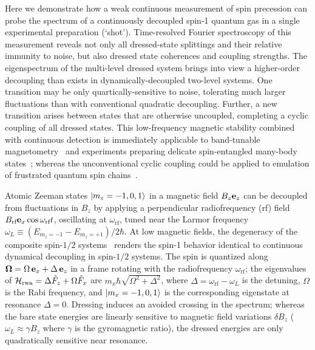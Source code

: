 \documentclass[aps,prl,reprint,superscriptaddress,floatfix]{revtex4-1}
\begin{document}
Here we demonstrate how a weak continuous measurement of spin precession can probe the spectrum of a continuously decoupled spin-1 quantum gas in a single experimental preparation (`shot').
Time-resolved Fourier spectroscopy of this measurement reveals not only all dressed-state splittings and their relative immunity to noise, but also dressed state coherences and coupling strengths.
The eigenspectrum of the multi-level dressed system brings into view a higher-order decoupling than exists in dynamically-decoupled two-level systems.
One transition may be only quartically-sensitive to noise, tolerating much larger fluctuations than with conventional quadratic decoupling.
Further, a new transition arises between states that are otherwise uncoupled, completing a cyclic coupling of all dressed states.
This low-frequency magnetic stability combined with continuous detection is immediately applicable to band-tunable magnetometry~\cite{hirose_continuous_2012,loretz_radio-frequency_2013,ockeloen_quantum_2013,*horsley_frequency-tunable_2016} and experiments preparing delicate spin-entangled many-body states~\cite{stamper-kurn_spinor_2013}; whereas the unconventional cyclic coupling could be applied to emulation of frustrated quantum spin chains~\cite{mikeska_one-dimensional_2004}.

Atomic Zeeman states $\vert m_z=-1,0,1 \rangle $ in a magnetic field $B_z \mathbf{e}_z$ can be decoupled from fluctuations in $B_z$ by applying a perpendicular radiofrequency (rf) field $B_{\text{rf}} \mathbf{e}_x \cos \omega_\text{rf} t$, oscillating at $\omega_\text{rf}$, tuned near the Larmor frequency $\omega_L \equiv (E_{m_z=-1}-E_{m_z=+1})/2\hbar$.
At low magnetic fields, the degeneracy of the composite spin-$1/2$ systems~\cite{majorana_atomi_1932} renders the spin-1 behavior identical to continuous dynamical decoupling in spin-$1/2$ systems.
The spin is quantized along $\mathbf{\Omega} = \Omega \, \mathbf{e}_x + \Delta \, \mathbf{e}_z$ in a frame rotating with the radiofrequency $\omega_{\text{rf}}$; the eigenvalues of $\mathcal{H}_{\text{rwa}} = \Delta \hat{F}_z + \Omega \hat{F}_x$ are $m_x \hbar \sqrt{\Omega^2 + \Delta^2}$, where $\Delta = \omega_{\text{rf}}-\omega_L$ is the detuning, $\Omega$ is the Rabi frequency, and $\vert m_x=-1,0,1 \rangle $ is the corresponding eigenstate at resonance $\Delta=0$.
Dressing induces an avoided crossing in the spectrum; whereas the bare state energies are linearly sensitive to magnetic field variations $\delta B_z$ ($\omega_L \approx \gamma B_z$ where $\gamma$ is the gyromagnetic ratio), the dressed energies are only quadratically sensitive near resonance.
\end{document}
